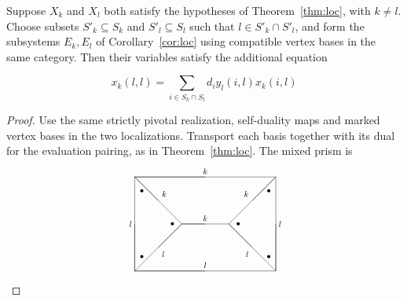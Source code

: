 \documentclass{amsart}
\begin{document}
\begin{theorem} \label{thm:locextra}
Suppose $X_k$ and $X_l$ both satisfy the hypotheses of Theorem~\ref{thm:loc}, with $k\ne l$. Choose subsets $S'_k\subseteq S_k$ and $S'_l\subseteq S_l$ such that $l\in S'_k\cap S'_l$, and form the subsystems $E_k,E_l$ of Corollary~\ref{cor:loc} using compatible vertex bases in the same category. Then their variables satisfy the additional equation

$$ x_k(l,l) = \sum_{i \in S_k \cap S_l} d_i y_l(i,l)x_k(i,l)$$
\end{theorem}

\begin{proof}
Use the same strictly pivotal realization, self-duality maps and marked
vertex bases in the two localizations. Transport each basis together with
its dual for the evaluation pairing, as in Theorem~\ref{thm:loc}. The mixed prism is
$$
\scalebox{.75}{
\begin{tikzpicture}[scale=2]
\draw (0,2)--(3,2);
\draw (1,1)--(2,1);
\draw (0,0)--(3,0);
\draw (0,0) -- (0,2) -- (1,1) -- (0,0);
\draw (3,0)--(3,2)--(2,1)--(3,0);
\draw (0,2) -- (1.5,2) node [above] {$k$};
\draw (1,1) -- (1.5,1) node [above] {$k$};
\draw (0,0) -- (1.5,0) node [above] {$l$};
\draw (0,2) --++ (.5,-.5) node [above right=1pt] {$k$};
\draw (1,1) --++ (-.5,-.5) node [below right=1pt] {$l$};
\draw (0,0) -- (0,1) node [left] {$l$};
\draw (3,2) --++ (-.5,-.5) node [above left=1pt] {$k$};
\draw (2,1) --++ (.5,-.5) node [below left=1pt] {$l$};
\draw (3,0) -- (3,1) node [right] {$l$};
\node at (0+.15,2-.3) {$\bullet$};
\node at (1-.2,1) {$\bullet$};
\node at (0+.15,0+.3) {$\bullet$};
\node at (3-.15,2-.3) {$\bullet$};
\node at (2+.2,1) {$\bullet$};
\node at (3-.15,0+.3) {$\bullet$};
\end{tikzpicture}} $$


\end{proof}
\end{document}

